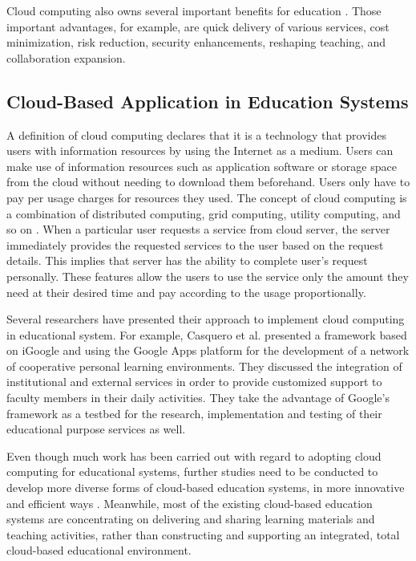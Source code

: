 \documentclass[journal]{vgtc}
\begin{document}
  Cloud computing also owns several important benefits for education \cite{Bouyer2014}. Those important advantages, for example, are quick delivery of various services, cost minimization, risk reduction, security enhancements, reshaping teaching, and collaboration expansion.

  \subsection{Cloud-Based Application in Education Systems}
  A definition of cloud computing declares that it is a technology that provides users with information resources by using the Internet as a medium. Users can make use of information resources such as application software or storage space from the cloud without needing to download them beforehand. Users only have to pay per usage charges for resources they used. The concept of cloud computing is a combination of distributed computing, grid computing, utility computing, and so on \cite{s110807835}. When a particular user requests a service from cloud server, the server immediately provides the requested services to the user based on the  request details. This implies that server has the ability to complete user's request personally. These features allow the users to use the service only the amount they need at their desired time and pay according to the usage proportionally.
  
  Several researchers have presented their approach to implement cloud computing in educational system. For example, Casquero et al. \cite{casquero2008igoogle} presented a framework based on iGoogle and using the Google Apps platform for the development of a network of cooperative personal learning environments. They discussed the integration of institutional and external services in order to provide customized support to faculty members in their daily activities. They take the advantage of Google's framework as a testbed for the research, implementation and testing of their educational purpose services as well.

  Even though much work has been carried out with regard to adopting cloud computing for educational systems, further studies need to be conducted to develop more diverse forms of cloud-based education systems, in more innovative and efficient ways \cite{jeong2013content}. Meanwhile, most of the existing cloud-based education systems are concentrating on delivering and sharing learning materials and teaching activities, rather than constructing and supporting an integrated, total cloud-based educational environment.
\end{document}
